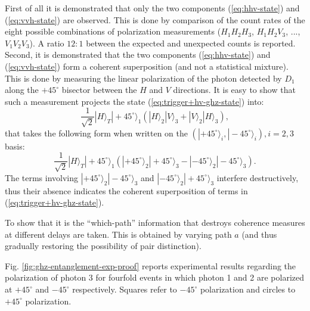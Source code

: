 First of all it is demonstrated that only the two components (\ref{eq:hhv-state}) and (\ref{eq:vvh-state}) are observed. This is done by comparison of the count rates of the eight possible combinations of polarization measurements ($H_1 H_2 H_3$, $H_1 H_2 V_3$, ..., $V_1 V_2 V_3$). A ratio $12:1$ between the expected and unexpected counts is reported. Second, it is demonstrated that the two components (\ref{eq:hhv-state}) and (\ref{eq:vvh-state}) form a coherent superposition (and not a statistical mixture). This is done by measuring the linear polarization of the photon detected by $D_1$ along the $+ 45^\circ$ bisector between the $H$ and $V$ directions. It is easy to show that such a measurement projects the state (\ref{eq:trigger+hv-ghz-state}) into:
\begin{equation*}
    \frac{1}{\sqrt{2}} |H\rangle_T |+ 45^\circ\rangle_1 \left( |H\rangle_2 |V\rangle_3 + |V\rangle_2 |H\rangle_3 \right),
\end{equation*}
that takes the following form when written on the $( |+ 45^\circ\rangle_i, |- 45^\circ\rangle_i), i = 2, 3$ basis:
\begin{equation*}
    \frac{1}{\sqrt{2}} |H\rangle_T |+ 45^\circ\rangle_1 \left( |+ 45^\circ\rangle_2 |+ 45^\circ\rangle_3 - |- 45^\circ\rangle_2 |- 45^\circ\rangle_3 \right).
\end{equation*}
The terms involving $|+ 45^\circ\rangle_2 |- 45^\circ\rangle_3$ and $|- 45^\circ\rangle_2 |+ 45^\circ\rangle_3$ interfere destructively, thus their absence indicates the coherent superposition of terms in (\ref{eq:trigger+hv-ghz-state}).

To show that it is the ``which-path'' information that destroys coherence measures at different delays are taken. This is obtained by varying path $a$ (and thus gradually restoring the possibility of pair distinction).

Fig. \ref{fig:ghz-entanglement-exp-proof} reports experimental results regarding the polarization of photon 3 for fourfold events in which photon 1 and 2 are polarized at $+ 45^\circ$ and $- 45^\circ$ respectively. Squares refer to $- 45^\circ$ polarization and circles to $+ 45^\circ$ polarization.

